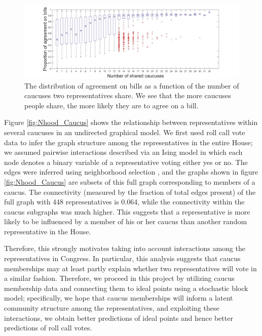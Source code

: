 \documentclass{article}
\begin{document}
\begin{figure}[h]
  \centering
        \includegraphics[width=\textwidth]{Caucus_vs_Votes.jpg}
  \caption{The distribution of agreement on bills as a function of the number of caucuses two representatives share. We see that the more caucuses people share, the more likely they are to agree on a bill. }
          \label{fig:VotesVsCaucus}
\end{figure}


Figure \ref{fig:Nhood_Caucus} shows the relationship between representatives within several caucuses in an undirected graphical model. We first used roll call vote data to infer the graph structure among the representatives in the entire House; we assumed pairwise interactions described via an Ising model in which each node denotes a binary variable of a representative voting either yes or no. The edges were inferred using neighborhood selection \cite{Hastie2015}, and the graphs shown in figure \ref{fig:Nhood_Caucus} are subsets of this full graph corresponding to members of a caucus. The connectivity (measured by the fraction of total edges present) of the full graph with 448 representatives is 0.064, while the connectivity within the caucus subgraphs was much higher. This suggests that a representative is more likely to be influenced by a member of his or her caucus than another random representative in the House.\par

Therefore, this strongly motivates taking into account interactions among the representatives in Congress. In particular, this analysis suggests that caucus memberships may at least partly explain whether two representatives will vote in a similar fashion. Therefore, we proceed in this project by utilizing caucus membership data and connecting them to ideal points using a stochastic block model; specifically, we hope that caucus memberships will inform a latent community structure among the representatives, and exploiting these interactions, we obtain better predictions of ideal points and hence better predictions of roll call votes. 
\end{document}
